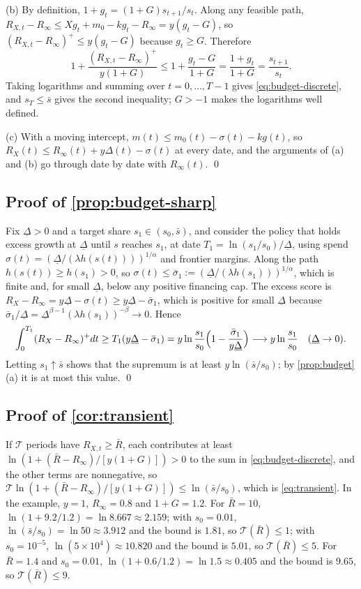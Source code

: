(b) By definition, $1+g_t=(1+G)s_{t+1}/s_t$. Along any feasible path, $R_{X,t}-R_\infty\le X g_t+m_0-kg_t-R_\infty=y(g_t-G)$, so $(R_{X,t}-R_\infty)^+\le y(g_t-G)$ because $g_t\ge G$. Therefore
\[
1+\frac{(R_{X,t}-R_\infty)^+}{y(1+G)}\le 1+\frac{g_t-G}{1+G}=\frac{1+g_t}{1+G}=\frac{s_{t+1}}{s_t}.
\]
Taking logarithms and summing over $t=0,\dots,T-1$ gives \eqref{eq:budget-discrete}, and $s_T\le\bar s$ gives the second inequality; $G>-1$ makes the logarithms well defined.

(c) With a moving intercept, $m(t)\le m_0(t)-\sigma(t)-kg(t)$, so $R_X(t)\le R_\infty(t)+y\Delta(t)-\sigma(t)$ at every date, and the arguments of (a) and (b) go through date by date with $R_\infty(t)$. \qed

\subsection*{Proof of \autoref{prop:budget-sharp}}

Fix $\underline\Delta>0$ and a target share $s_1\in(s_0,\bar s)$, and consider the policy that holds excess growth at $\underline\Delta$ until $s$ reaches $s_1$, at date $T_1=\ln(s_1/s_0)/\underline\Delta$, using spend $\sigma(t)=(\underline\Delta/(\lambda h(s(t))))^{1/\alpha}$ and frontier margins. Along the path $h(s(t))\ge h(s_1)>0$, so $\sigma(t)\le\bar\sigma_1:=(\underline\Delta/(\lambda h(s_1)))^{1/\alpha}$, which is finite and, for small $\underline\Delta$, below any positive financing cap. The excess score is $R_X-R_\infty=y\underline\Delta-\sigma(t)\ge y\underline\Delta-\bar\sigma_1$, which is positive for small $\underline\Delta$ because $\bar\sigma_1/\underline\Delta=\underline\Delta^{\beta-1}(\lambda h(s_1))^{-\beta}\to 0$. Hence
\[
\int_0^{T_1}(R_X-R_\infty)^+dt\ge T_1(y\underline\Delta-\bar\sigma_1)=y\ln\frac{s_1}{s_0}\Bigl(1-\frac{\bar\sigma_1}{y\underline\Delta}\Bigr)\longrightarrow y\ln\frac{s_1}{s_0}\quad(\underline\Delta\to 0).
\]
Letting $s_1\uparrow\bar s$ shows that the supremum is at least $y\ln(\bar s/s_0)$; by \autoref{prop:budget}(a) it is at most this value. \qed

\subsection*{Proof of \autoref{cor:transient}}

If $\mathcal T$ periods have $R_{X,t}\ge\bar R$, each contributes at least $\ln(1+(\bar R-R_\infty)/[y(1+G)])>0$ to the sum in \eqref{eq:budget-discrete}, and the other terms are nonnegative, so $\mathcal T\ln(1+(\bar R-R_\infty)/[y(1+G)])\le\ln(\bar s/s_0)$, which is \eqref{eq:transient}. In the example, $y=1$, $R_\infty=0.8$ and $1+G=1.2$. For $\bar R=10$, $\ln(1+9.2/1.2)=\ln 8.667\approx 2.159$; with $s_0=0.01$, $\ln(\bar s/s_0)=\ln 50\approx 3.912$ and the bound is $1.81$, so $\mathcal T(\bar R)\le 1$; with $s_0=10^{-5}$, $\ln(5\times 10^4)\approx 10.820$ and the bound is $5.01$, so $\mathcal T(\bar R)\le 5$. For $\bar R=1.4$ and $s_0=0.01$, $\ln(1+0.6/1.2)=\ln 1.5\approx 0.405$ and the bound is $9.65$, so $\mathcal T(\bar R)\le 9$.

